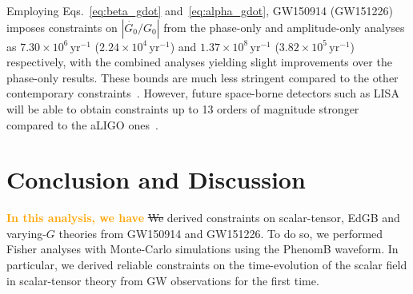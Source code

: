 \documentclass[prd,twocolumn,nofootinbib]{revtex4-1}
\newcommand{\zack}[1]{\textcolor{orange}{\textbf{#1}} }
\begin{document}
Employing Eqs.~\eqref{eq:beta_gdot} and~\eqref{eq:alpha_gdot}, GW150914 (GW151226) imposes constraints on $|\dot{G_0}/G_0|$ from the phase-only and amplitude-only analyses as $7.30\times10^6\, \mathrm{yr}^{-1}$ ($2.24\times10^4\, \mathrm{yr}^{-1}$) and $1.37\times10^8\, \mathrm{yr}^{-1}$ ($3.82\times10^5\, \mathrm{yr}^{-1}$) respectively, with the combined analyses yielding slight improvements over the phase-only results.
These bounds are much less stringent compared to the other contemporary constraints~\cite{Will2006}. 
However, future space-borne detectors such as LISA~\cite{Seoane:2013qna,Audley:2017drz} will be able to obtain constraints up to 13 orders of magnitude stronger compared to  the aLIGO ones~\cite{Yunes:2009bv,Chamberlain:2017fjl}.


\section{Conclusion and Discussion}\label{conclusion}
\zack{In this analysis, we have} \sout{We} derived constraints on scalar-tensor, EdGB and varying-$G$ theories from GW150914 and GW151226. To do so, we performed Fisher analyses with Monte-Carlo simulations using the PhenomB waveform.
In particular, we derived reliable constraints on the time-evolution of the scalar field in scalar-tensor theory from GW observations for the first time. 
\end{document}
